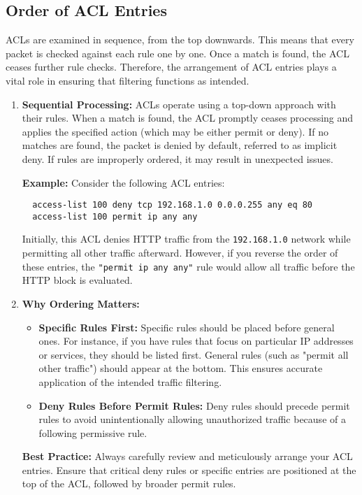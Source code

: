 \documentclass[11pt,a4paper]{article}
\begin{document}
    \subsection*{Order of ACL Entries}
        ACLs are examined in sequence, from the top downwards. This means that every packet is checked against each rule one by one. Once a match is found, the ACL ceases further rule checks. Therefore, the arrangement of ACL entries plays a vital role in ensuring that filtering functions as intended.
        \begin{enumerate}
            \item \textbf{Sequential Processing:} ACLs operate using a top-down approach with their rules. When a match is found, the ACL promptly ceases processing and applies the specified action (which may be either permit or deny). If no matches are found, the packet is denied by default, referred to as implicit deny. If rules are improperly ordered, it may result in unexpected issues.
            
            \textbf{Example:} Consider the following ACL entries:
\begin{lstlisting}
  access-list 100 deny tcp 192.168.1.0 0.0.0.255 any eq 80
  access-list 100 permit ip any any
\end{lstlisting}
            Initially, this ACL denies HTTP traffic from the \lstinline{192.168.1.0} network while permitting all other traffic afterward. However, if you reverse the order of these entries, the \lstinline{"permit ip any any"} rule would allow all traffic before the HTTP block is evaluated.

            \item \textbf{Why Ordering Matters:} 
                \begin{itemize}
                    \item \textbf{Specific Rules First:} Specific rules should be placed before general ones. For instance, if you have rules that focus on particular IP addresses or services, they should be listed first. General rules (such as "permit all other traffic") should appear at the bottom. This ensures accurate application of the intended traffic filtering.
                    \\[1em]
                    \item \textbf{Deny Rules Before Permit Rules:} Deny rules should precede permit rules to avoid unintentionally allowing unauthorized traffic because of a following permissive rule.
                \end{itemize}
                \textbf{Best Practice:} Always carefully review and meticulously arrange your ACL entries. Ensure that critical deny rules or specific entries are positioned at the top of the ACL, followed by broader permit rules.

        \end{enumerate}
\end{document}
